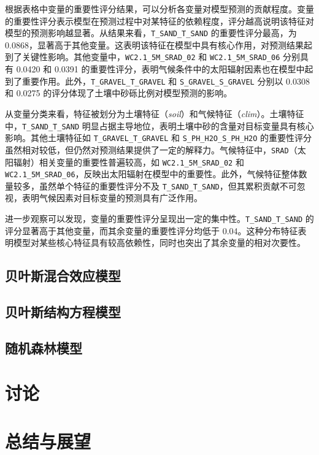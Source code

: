\documentclass[AutoFakeBold]{LZUThesis-PgD&PhD}
\begin{document}
根据表格中变量的重要性评分结果，可以分析各变量对模型预测的贡献程度。变量的重要性评分表示模型在预测过程中对某特征的依赖程度，评分越高说明该特征对模型的预测影响越显著。从结果来看，\texttt{T\_SAND\_T\_SAND} 的重要性评分最高，为 0.0868，显著高于其他变量。这表明该特征在模型中具有核心作用，对预测结果起到了关键性影响。其他变量中，\texttt{WC2.1\_5M\_SRAD\_02} 和 \texttt{WC2.1\_5M\_SRAD\_06} 分别具有 0.0420 和 0.0391 的重要性评分，表明气候条件中的太阳辐射因素也在模型中起到了重要作用。此外，\texttt{T\_GRAVEL\_T\_GRAVEL} 和 \texttt{S\_GRAVEL\_S\_GRAVEL} 分别以 0.0308 和 0.0275 的评分体现了土壤中砂砾比例对模型预测的影响。

从变量分类来看，特征被划分为土壤特征（\textit{soil}）和气候特征（\textit{clim}）。土壤特征中，\texttt{T\_SAND\_T\_SAND} 明显占据主导地位，表明土壤中砂的含量对目标变量具有核心影响。其他土壤特征如 \texttt{T\_GRAVEL\_T\_GRAVEL} 和 \texttt{S\_PH\_H2O\_S\_PH\_H2O} 的重要性评分虽然相对较低，但仍然对预测结果提供了一定的解释力。气候特征中，\texttt{SRAD}（太阳辐射）相关变量的重要性普遍较高，如 \texttt{WC2.1\_5M\_SRAD\_02} 和 \texttt{WC2.1\_5M\_SRAD\_06}，反映出太阳辐射在模型中的重要性。此外，气候特征整体数量较多，虽然单个特征的重要性评分不及 \texttt{T\_SAND\_T\_SAND}，但其累积贡献不可忽视，表明气候因素对目标变量的预测具有广泛作用。

进一步观察可以发现，变量的重要性评分呈现出一定的集中性。\texttt{T\_SAND\_T\_SAND} 的评分显著高于其他变量，而其余变量的重要性评分均低于 0.04。这种分布特征表明模型对某些核心特征具有较高依赖性，同时也突出了其余变量的相对次要性。

\section{贝叶斯混合效应模型}

\section{贝叶斯结构方程模型}

\section{随机森林模型}




\chapter{讨论}

\chapter{总结与展望}
\end{document}
